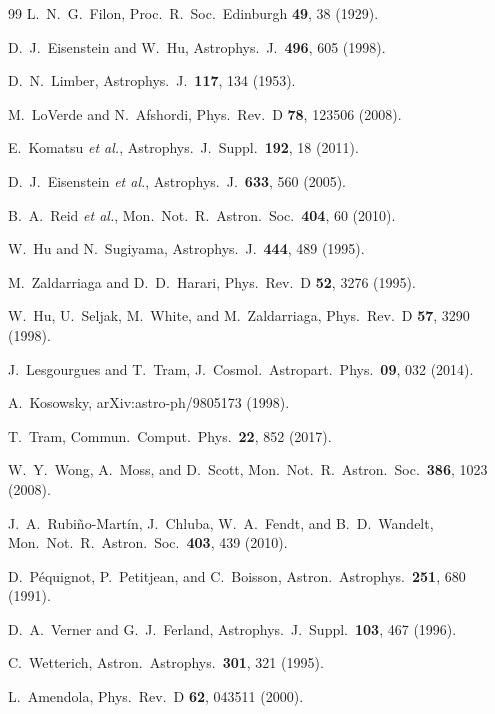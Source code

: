 \begin{thebibliography}{99}
L.~N.~G.~Filon, Proc.\ R.\ Soc.\ Edinburgh \textbf{49}, 38 (1929).

D.~J.~Eisenstein and W.~Hu, Astrophys.\ J.\ \textbf{496}, 605 (1998).

D.~N.~Limber, Astrophys.\ J.\ \textbf{117}, 134 (1953).

M.~LoVerde and N.~Afshordi, Phys.\ Rev.\ D \textbf{78}, 123506 (2008).

E.~Komatsu \textit{et al.}, Astrophys.\ J.\ Suppl.\ \textbf{192}, 18 (2011).

D.~J.~Eisenstein \textit{et al.}, Astrophys.\ J.\ \textbf{633}, 560 (2005).

B.~A.~Reid \textit{et al.}, Mon.\ Not.\ R.\ Astron.\ Soc.\ \textbf{404}, 60 (2010).

W.~Hu and N.~Sugiyama, Astrophys.\ J.\ \textbf{444}, 489 (1995).

M.~Zaldarriaga and D.~D.~Harari, Phys.\ Rev.\ D \textbf{52}, 3276 (1995).

W.~Hu, U.~Seljak, M.~White, and M.~Zaldarriaga, Phys.\ Rev.\ D \textbf{57}, 3290 (1998).

J.~Lesgourgues and T.~Tram, J.\ Cosmol.\ Astropart.\ Phys.\ \textbf{09}, 032 (2014).

A.~Kosowsky, arXiv:astro-ph/9805173 (1998).

T.~Tram, Commun.\ Comput.\ Phys.\ \textbf{22}, 852 (2017).


W.~Y.~Wong, A.~Moss, and D.~Scott, Mon.\ Not.\ R.\ Astron.\ Soc.\ \textbf{386}, 1023 (2008).

J.~A.~Rubi\~no-Mart\'in, J.~Chluba, W.~A.~Fendt, and B.~D.~Wandelt, Mon.\ Not.\ R.\ Astron.\ Soc.\ \textbf{403}, 439 (2010).

D.~P\'equignot, P.~Petitjean, and C.~Boisson, Astron.\ Astrophys.\ \textbf{251}, 680 (1991).

D.~A.~Verner and G.~J.~Ferland, Astrophys.\ J.\ Suppl.\ \textbf{103}, 467 (1996).

C.~Wetterich, Astron.\ Astrophys.\ \textbf{301}, 321 (1995).

L.~Amendola, Phys.\ Rev.\ D \textbf{62}, 043511 (2000).


\end{thebibliography}
